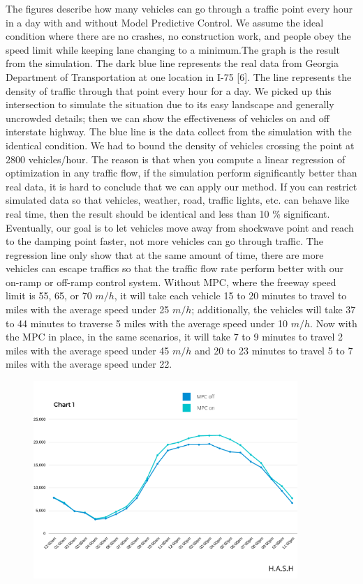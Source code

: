 \documentclass{article}
\begin{document}
The figures describe how many vehicles can go through a traffic point every hour in a day with and without Model Predictive Control. We assume the ideal condition where there are no crashes, no construction work, and people obey the speed limit while keeping lane changing to a minimum.The graph is the result from the simulation. The dark blue line represents the real data from
Georgia Department of Transportation at one location in I-75 [6]. The line represents the density of traffic through
that point every hour for a day. We picked up this intersection to simulate the situation due to its easy landscape and
generally uncrowded details; then we can show the effectiveness of vehicles on and off interstate highway. The blue line
is the data collect from the simulation with the identical condition. We had to bound the density of vehicles crossing the
point at 2800 vehicles/hour. The reason is that when you compute a linear regression of optimization in any traffic flow,
if the simulation perform significantly better than real data, it is hard to conclude that we can apply our method. If you
can restrict simulated data so that vehicles, weather, road, traffic lights, etc. can behave like real time, then the result
should be identical and less than 10 \% significant. Eventually, our goal is to let vehicles move away from shockwave
point and reach to the damping point faster, not more vehicles can go through traffic. The regression line only show that
at the same amount of time, there are more vehicles can escape traffics so that the traffic flow rate perform better with
our on-ramp or off-ramp control system. Without MPC, where the freeway speed limit is 55, 65, or 70 $m/h$, it will take each vehicle 15 to 20 minutes to travel to miles with the average speed under 25 $m/h$; additionally, the vehicles will take 37 to 44 minutes to traverse 5 miles with the average speed under 10 $m/h$. Now with the MPC in place, in the same scenarios, it will take 7 to 9 minutes to travel 2 miles with the average speed under 45 $m/h$ and 20 to 23 minutes to travel 5 to 7 miles with the average speed under 22.

\begin{figure}[ht]
    \centering
    \includegraphics[width=100mm,scale=0.5]{Chart_1.png}
    
\end{figure}
\end{document}
